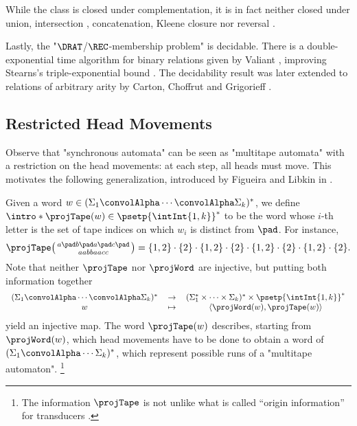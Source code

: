 While the class is closed under complementation, it is in fact neither closed under union,
intersection \cite[Theorem~17]{RabinScott1959FiniteAutomata},
concatenation, Kleene closure nor reversal
\cite[Table~1]{FischerRosenberg1968Multitape}.

Lastly, the "$\DRAT$/$\REC$-membership problem" is decidable.
There is a double-exponential time algorithm for binary relations
given by Valiant \cite{Valiant1975RegularityDeterministicPushdown}, improving Stearns's
triple-exponential bound \cite{Stearns1967RegularityPushdown}.
The decidability result was later extended to relations of arbitrary arity by Carton, Choffrut and 
Grigorieff \cite[Theorem 3.7]{CartonChoffrutGrigorieff2006DecisionProblems}.

\subsection{Restricted Head Movements}
\label{sec:preliminaries-automatic-structures-relations-restricted-head-movements}

Observe that "synchronous automata" can be seen as "multitape automata" with
a restriction on the head movements: at each step, all heads must move.
This motivates the following generalization, introduced by Figueira and Libkin in
\cite{FigueiraLibkin2015SynchronizingRelations}.

Given a word $w \in (\Sigma_1 \convolAlpha \cdots \convolAlpha \Sigma_k)^*$,
we define \AP$\intro*\projTape(w) \in \psetp{\intInt{1,k}}^*$ to be the word
whose $i$-th letter is the set of tape indices on which $w_i$ is distinct from $\pad$. 
For instance,
\[
	\projTape\pair{a \pad b \pad a \pad c \pad}{a a b b a a c c}
	= \{1,2\} \cdot \{2\} \cdot \{1,2\} \cdot \{2\} \cdot \{1,2\} \cdot \{2\} \cdot \{1,2\} \cdot \{2\}.
\]
Note that neither $\projTape$ nor $\projWord$ are injective, but putting both information together 
\[
	\begin{tabular}{ccc}
		$(\Sigma_1 \convolAlpha \cdots \convolAlpha \Sigma_k)^*$ & $\to$
			& $(\Sigma_1^* \times \cdots \times \Sigma_k)^* \times \psetp{\intInt{1,k}}^*$\\
		$w$ & $\mapsto$ & $\tup{\projWord(w), \projTape(w)}$
	\end{tabular}
\]
yield an injective map.
The word $\projTape(w)$ describes, starting from $\projWord(w)$, which 
head movements have to be done to obtain a word of $(\Sigma_1 \convolAlpha \cdots \Sigma_k)^*$, which represent possible runs of a "multitape automaton".%
\footnote{The information $\projTape$ is not unlike what is called
``origin information'' for transducers \cite{Bojanczyk2014TransducersOriginInformation}.}

